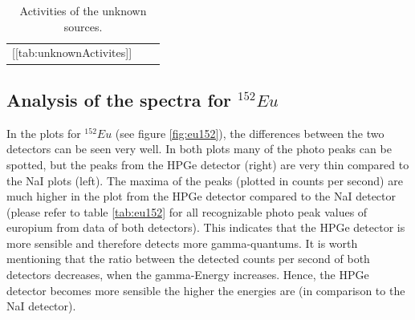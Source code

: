 \documentclass[a4paper]{article}
\begin{document}
\begin{table}[H]
\centering
\begin{tabular}{r|rr}
[[tab:unknownActivites]]
\end{tabular}
\caption{Activities of the unknown sources.}
\label{tab:unknownActivites}
\end{table}

\subsection{Analysis of the spectra for $^{152}Eu$}
\label{sec:eu}

In the plots for $^{152}Eu$ (see figure \ref{fig:eu152}), the differences between the two detectors can be seen very well. In both plots many of the photo peaks can be spotted, but the peaks from the HPGe detector (right) are very thin compared to the NaI plots (left). The maxima of the peaks (plotted in counts per second) are much higher in the plot from the HPGe detector compared to the NaI detector (please refer to table \ref{tab:eu152} for all recognizable photo peak values of europium from data of both detectors). This indicates that the HPGe detector is more sensible and therefore detects more gamma-quantums. It is worth mentioning that the ratio between the detected counts per second of both detectors decreases, when the gamma-Energy increases. Hence, the HPGe detector becomes more sensible the higher the energies are (in comparison to the NaI detector).
\end{document}
